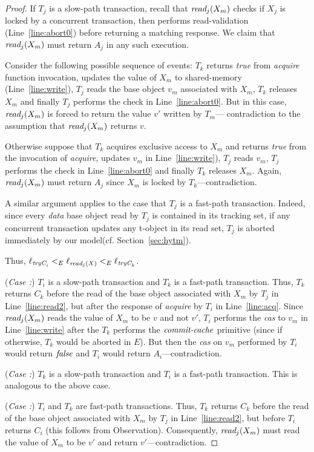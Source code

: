 \begin{proof}
If $T_j$ is a slow-path transaction, 
recall that $\textit{read}_j(X_m)$ checks if $X_j$ is locked by a concurrent transaction, 
then performs read-validation (Line~\ref{line:abort0}) before returning a matching response. 
We claim that $\textit{read}_j(X_m)$ must return $A_j$ in any such execution.

Consider the following possible sequence of events: 
$T_k$ returns \emph{true} from \emph{acquire} function invocation, 
updates the value of $X_m$ to shared-memory (Line~\ref{line:write}), 
$T_j$ reads the base object $v_m$ associated with $X_m$, 
$T_k$ releases $X_m$ and finally $T_j$ performs the check in Line~\ref{line:abort0}. 
But in this case, $\textit{read}_j(X_m)$ is forced to return the value $v'$ written by $T_m$--- 
contradiction to the assumption that $\textit{read}_j(X_m)$ returns $v$. 

Otherwise suppose that $T_k$ acquires exclusive access to $X_m$ and returns \emph{true}
from the invocation of \emph{acquire}, updates $v_m$ in Line~\ref{line:write}), 
$T_j$ reads $v_m$, $T_j$ performs the check in Line~\ref{line:abort0} and finally $T_k$ 
releases $X_m$. 
Again, $\textit{read}_j(X_m)$ must return $A_j$ since $X_m$ is locked by $T_k$---contradiction.

A similar argument applies to the case that $T_j$ is a fast-path transaction.
Indeed, since every \emph{data} base object read by $T_j$ is contained in its tracking set, if any concurrent
transaction updates any t-object in its read set, $T_j$ is aborted immediately by our model(cf. Section~\ref{sec:hytm}).

Thus, $\ell_{\textit{tryC}_i} <_E \ell_{\textit{read}_j(X)} <_{E} \ell_{\textit{tryC}_k}$.

(\textit{Case :}) $T_i$ is a slow-path transaction and $T_k$ is a fast-path transaction.
Thus, $T_k$ returns $C_k$ 
before the read of the base object associated with $X_m$ by $T_j$ in Line~\ref{line:read2}, but after the response
of \emph{acquire} by $T_i$ in Line~\ref{line:acq}.
Since $\textit{read}_j(X_m)$ reads the value of $X_m$ to be $v$ and not $v'$, $T_i$ performs the \emph{cas}
to $v_m$ in Line~\ref{line:write} after the $T_k$ performs the $\ms{commit-cache}$ primitive (since if
otherwise, $T_k$ would be aborted in $E$).
But then the \emph{cas} on $v_m$ performed by $T_i$ would return $\mathit{false}$ and $T_i$ would return $A_i$---contradiction.

(\textit{Case :}) $T_k$ is a slow-path transaction and $T_i$ is a fast-path transaction.
This is analogous to the above case.

(\textit{Case :}) $T_i$ and $T_k$ are fast-path transactions.
Thus, $T_k$ returns $C_k$ 
before the read of the base object associated with $X_m$ by $T_j$ in Line~\ref{line:read2}, but before $T_i$
returns $C_i$ (this follows from Observation).
Consequently, $\textit{read}_j(X_m)$ must read the value of $X_m$ to be $v'$ and return $v'$---contradiction.
%


\end{proof}
